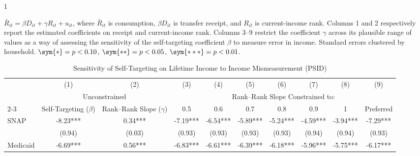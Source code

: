 \begin{table}[]
\begin{spacing}{1}
\begin{tablenotes}
  $\bar{R}_{it}=\beta D_{it}+\gamma R_{it}+u_{it}$, where $\bar{R}_{it}$ is consumption, $\beta D_{it}$ is transfer receipt, and $R_{it}$ is current-income rank. Columns 1 and 2 respectively report the estimated coefficients on receipt and current-income rank. Columns 3--9
 restrict the coefficient $\gamma$ across its plausible range of values as a way of assessing the sensitivity of the self-targeting coefficient $\beta$ to measure error in income. Standard errors clustered by household. $\sym{*}=p<0.10$, $\sym{**}=p<0.05$, $\sym{***}=p<0.01$. 
\end{tablenotes}
\end{spacing}
\end{table}

\begin{table}[]     \footnotesize     \centering
\caption{Sensitivity of Self-Targeting on Lifetime Income to Income Mismeasurement (PSID)}
\label{tab:constrained_reg_li}
\begin{tabular*}{1.36\textwidth}{@{\extracolsep{\fill}}lccccccccc}
\toprule
                   & (1)                               & (2)                               & (3)                             & (4)                             & (5)                             & (6)                             & (7)                             & (8)                             & (9) \\
                   & \multicolumn{2}{c}{Unconstrained} & \multicolumn{7}{c}{Rank--Rank Slope Constrained to:} \\
\cmidrule{2-3}\cmidrule{4-10}
                   & Self-Targeting ($\beta$)          & Rank--Rank Slope ($\gamma$)       & 0.5                             & 0.6                             & 0.7                             & 0.8                             & 0.9                             & 1                               & Preferred \\
\midrule
\addlinespace
SNAP               & -8.23***        & 0.34***        & -7.19***        & -6.54***        & -5.89***        & -5.24***        & -4.59***        & -3.94***        & -7.29*** \\
                   & (0.94)            & (0.03)            & (0.93)            & (0.93)            & (0.93)            & (0.93)            & (0.94)            & (0.94)            & (0.93)     \\
\addlinespace
Medicaid           & -6.69***    & 0.56***    & -6.83***    & -6.61***    & -6.39***    & -6.18***    & -5.96***    & -5.75***    & -6.17*** \\

\end{tabular*}
\end{table}
